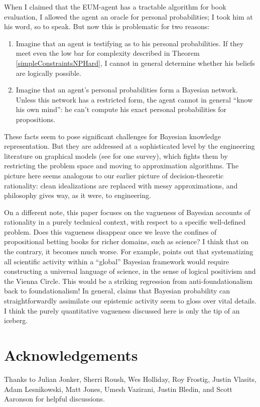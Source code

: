 \documentclass[letterpaper,12pt]{article}
\begin{document}
When I claimed that the EUM-agent has a tractable algorithm for book evaluation, I allowed the agent an oracle for personal probabilities; I took him at his word, so to speak. But now this is problematic for two reasons:
\begin{enumerate}
\item
Imagine that an agent is testifying as to his personal probabilities. If they meet even the low bar for complexity described in Theorem \ref{simpleConstraintsNPHard}, I cannot in general determine whether his beliefs are logically possible.
\item
Imagine that an agent's personal probabilities form a Bayesian network. Unless this network has a restricted form, the agent cannot in general ``know his own mind'': he can't compute his exact personal probabilities for propositions.
\end{enumerate}

These facts seem to pose significant challenges for Bayesian knowledge representation. But they are addressed at a sophisticated level by the engineering literature on graphical models (see \cite{citeulike:3470282} for one survey), which fights them by restricting the problem space and moving to approximation algorithms. The picture here seems analogous to our earlier picture of decision-theoretic rationality: clean idealizations are replaced with messy approximations, and philosophy gives way, as it were, to engineering.

On a different note, this paper focuses on the vagueness of Bayesian accounts of rationality in a purely technical context, with respect to a specific well-defined problem. Does this vagueness disappear once we leave the confines of propositional betting books for richer domains, such as science? I think that on the contrary, it becomes much worse. For example, \cite{garber1983} points out that systematizing all scientific activity within a ``global'' Bayesian framework would require constructing a universal language of science, in the sense of logical positivism and the Vienna Circle. This would be a striking regression from anti-foundationalism back to foundationalism! In general, claims that Bayesian probability can straightforwardly assimilate our epistemic activity seem to gloss over vital details. I think the purely quantitative vagueness discussed here is only the tip of an iceberg.

\section{Acknowledgements}
Thanks to Julian Jonker, Sherri Roush, Wes Holliday, Roy Frostig, Justin Vlasits, Adam Lesnikowski, Matt Jones, Umesh Vazirani, Justin Bledin, and Scott Aaronson for helpful discussions.


\end{document}
